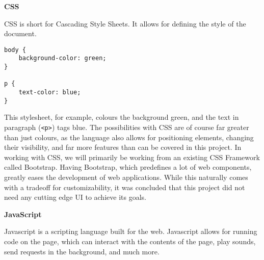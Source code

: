 \textbf{CSS}

CSS is short for Cascading Style Sheets. It allows for defining the style of the document.
\begin{lstlisting}
body {
	background-color: green;
}

p {
	text-color: blue;
}
\end{lstlisting}
This stylesheet, for example, colours the background green, and the text in paragraph (\texttt{<p>}) tags blue. The possibilities with CSS are of course far greater than just colours, as the language also allows for positioning elements, changing their visibility, and far more features than can be covered in this project.\cite{nixonweb}
In working with CSS, we will primarily be working from an existing CSS Framework called Bootstrap. Having Bootstrap, which predefines a lot of web components, greatly eases the development of web applications. While this naturally comes with a tradeoff for customizability, it was concluded that this project did not need any cutting edge UI to achieve its goals.

\textbf{JavaScript}

Javascript is a scripting language built for the web.
Javascript allows for running code on the page, which can interact with the contents of the page, play sounds, send requests in the background, and much more.\cite{nixonweb}
